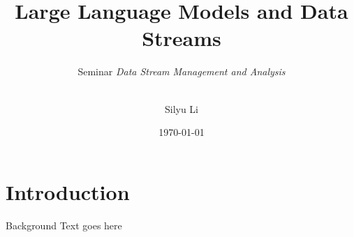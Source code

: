 \documentclass[t]{beamer}
\title{Large Language Models and Data Streams}
\subtitle{
  Seminar \textsl{Data Stream Management and Analysis}\\[1ex]
  \insertdate\\[1ex]
  \insertauthor
}
\date{\today}
\author{Silyu Li}
\institute{RWTH Aachen University}
\begin{document}
\begin{frame}[plain]
  \titlepage
\end{frame}

\section{Introduction}
\begin{frame}{Background}
  Text goes here
\end{frame}
\end{document}
